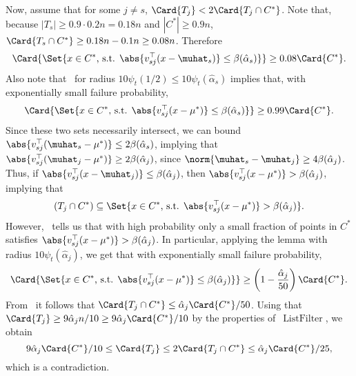 Now, assume that for some \(j \neq s\), \(\Card{T_j} < 2 \Card{T_j \cap C^{\ast}}\).
Note that, because $|T_s| \geq 0.9 \cdot 0.2 n = 0.18n$ and $|C^*| \geq 0.9 n$, \(\Card{T_s \cap C^*} \geq 0.18n - 0.1n \geq 0.08n\). Therefore
\begin{equation*}
    \Card{\Set{x \in C^{\ast} \text{, s.t. } \abs{v_{sj}^{\top}(x - \muhat_s)} \leq \beta(\hat \alpha_s)}} \geq 0.08 \Card{C^{\ast}}.
\end{equation*}
Also note that~ for radius \(10 \psi_t(1/2) \leq 10 \psi_t(\hat \alpha_s)\) implies that, with exponentially small failure probability,
\begin{equation*}
    \Card{\Set{x \in C^{\ast} \text{, s.t. } \abs{v_{sj}^{\top}(x - \mu^{\ast})} \leq \beta(\hat \alpha_s)}} \geq 0.99 \Card{C^{\ast}}.
\end{equation*}
Since these two sets necessarily intersect, we can bound \(\abs{v_{sj}^{\top}(\muhat_s - \mu^{\ast})} \leq 2\beta(\hat \alpha_s)\),
implying that \(\abs{v_{sj}^{\top}(\muhat_j - \mu^{\ast})} \geq 2\beta(\hat \alpha_j)\), since \(\norm{\muhat_s - \muhat_j} \geq 4\beta(\hat\alpha_j)\).
Thus, if \(\abs{v_{sj}^{\top}(x - \muhat_j)} \leq \beta(\hat \alpha_j)\), 
then \(\abs{v_{sj}^{\top}(x - \mu^{\ast})} > \beta(\hat \alpha_j)\), implying that 
\begin{equation}
    \label{eq:tq_non_intersect}
    (T_j \cap C^{\ast}) \subseteq \Set{x \in C^{\ast} \text{, s.t. } \abs{v_{sj}^{\top}(x - \mu^{\ast})} > \beta(\hat\alpha_j)}.
\end{equation}
However,~ tells us that with high probability only a small fraction of points in \(C^{\ast}\) satisfies \(\abs{v_{sj}^{\top}(x - \mu^{\ast})} > \beta(\hat \alpha_j)\).
In particular, applying the lemma with radius \(10 \psi_t(\hat \alpha_j)\), we get that with exponentially small failure probability, 
\begin{equation}
    \label{eq:tq_conc}
    \Card{\Set{x \in C^{\ast} \text{, s.t. } \abs{v_{sj}^{\top}(x - \mu^{\ast})} \leq \beta(\hat\alpha_j)}} 
    \geq \left(1 - \frac{\hat\alpha_j}{50}\right) \Card{C^{\ast}}.
\end{equation}
From~ it follows that \(\Card{T_j \cap C^{\ast}} \leq \hat \alpha_j \Card{C^{\ast}}  / 50\).
Using that \(\Card{T_j} \geq 9\hat \alpha_j n / 10 \geq 9\hat \alpha_j \Card{C^{\ast}} / 10\) by the properties of~\(\operatorname{ListFilter}\), we obtain 
\begin{equation*}
    9 \hat \alpha_j \Card{C^{\ast}} / 10\leq \Card{T_j} \leq 2 \Card{T_j \cap C^{\ast}} 
    \leq \hat \alpha_j \Card{C^{\ast}} / 25,
\end{equation*}
which is a contradiction.

